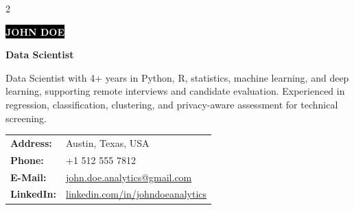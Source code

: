 \documentclass[10pt]{developercv}
\begin{document}
\begin{multicols}{2}

\begin{minipage}[t]{0.45\textwidth}

\colorbox{black}{{\huge\textcolor{white}{\textbf{\MakeUppercase{John Doe}}}}}

\vspace{0.2cm}
{\large \textbf{Data Scientist}}

\vspace{0.2cm}
Data Scientist with 4+ years in Python, R, statistics, machine learning, and deep learning, supporting remote interviews and candidate evaluation. Experienced in regression, classification, clustering, and privacy-aware assessment for technical screening.
\end{minipage}
\vfill\null
\columnbreak

\begin{minipage}[t]{0.55\textwidth}

\hspace{1.5cm}

\hspace{0.5cm}\begin{tabular}{@{}ll}
\textbf{Address:} & \hspace{0.1cm} Austin, Texas, USA\\
\textbf{Phone:} & \hspace{0.1cm} +1 512 555 7812\\
\textbf{E-Mail:} & \hspace{0.1cm} \href{mailto:john.doe.analytics@gmail.com}{john.doe.analytics@gmail.com}\\
\textbf{LinkedIn:} & \hspace{0.1cm} \href{https://www.linkedin.com/in/johndoeanalytics}{linkedin.com/in/johndoeanalytics}\\
\end{tabular}

\end{minipage}

\end{multicols}
\end{document}
